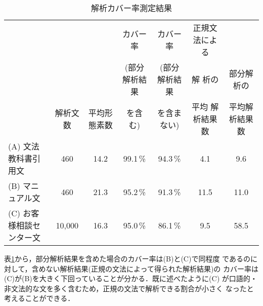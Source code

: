 \begin{table}[htbp]
\caption{解析カバー率測定結果}
\begin{tabular}{lcccccc}
\hline
&&&\scriptsize カバー率&\scriptsize カバー率 &\scriptsize 正規文法によ
る&\\
&&&\scriptsize (部分解析結果&\scriptsize (部分解析結果&\scriptsize 解
析の&\scriptsize 部分解析の\\
&\hspace*{-2mm}\scriptsize 解析文数&\hspace*{-2mm}\scriptsize 平均形態素数&\hspace*{-2mm}\scriptsize を含む)
&\hspace*{-2mm}\scriptsize を含まない)&\hspace*{-2mm}\scriptsize 平均
解析結果数&\hspace*{-2mm}\scriptsize 平均解析結果数\\
\hline
\scriptsize (A) 文法教科書引用文&\scriptsize 460&\scriptsize
14.2&\scriptsize 99.1\,\% &\scriptsize 94.3\,\% &\scriptsize 4.1&\scriptsize 9.6\\
\scriptsize (B) マニュアル文&\scriptsize 460&\scriptsize
21.3&\scriptsize 95.2\,\%&\scriptsize 91.3\,\%&\scriptsize
11.5&\scriptsize 11.0\\
\scriptsize (C) お客様相談センター文&\scriptsize 10,000&\scriptsize
16.3&\scriptsize 95.0\,\%&\scriptsize 86.1\,\%&\scriptsize 9.5&\scriptsize 58.5\\
\hline
\end{tabular}
\vspace{2mm}
\label{table3}
\end{table}
\normalsize



表\ref{table3}から，部分解析結果を含めた場合のカバー率は(B)と(C)で同程度
であるのに対して，含めない解析結果(正規の文法によって得られた解析結果)の
カバー率は(C)が(B)を大きく下回っていることが分かる．既に述べたように(C) 
が口語的・非文法的な文を多く含むため，正規の文法で解析できる割合が小さく
なったと考えることができる．

